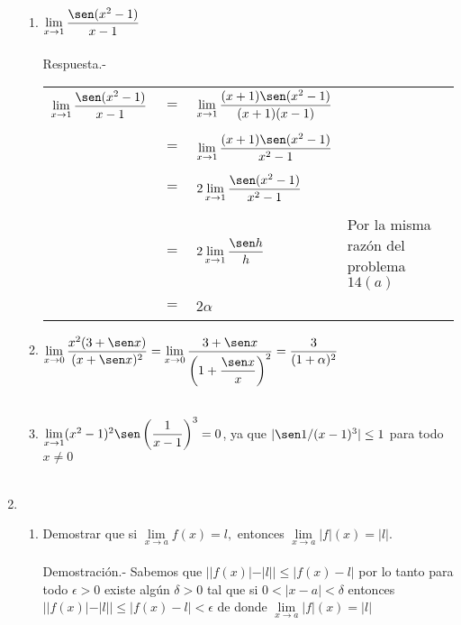 \begin{enumerate}
\begin{enumerate}[\bfseries (i)]
    \item $\lim\limits_{x\to 1}\dfrac{\sen(x^2-1)}{x-1}$\\\\
	Respuesta.-\; 
	\begin{center}
	    \begin{tabular}{rcll}
		$\lim\limits_{x\to 1} \dfrac{\sen (x^2 - 1)}{x-1}$ & $=$ & $\lim\limits_{x\to 1} \dfrac{(x+1)\sen(x^2 - 1)}{(x+1)(x-1)}$&\\\\
		 & $=$ & $\lim\limits_{x\to 1} \dfrac{(x+1)\sen (x^2 -1)}{x^2-1}$&\\\\
		 & $=$ & $2 \lim\limits_{x\to 1} \dfrac{\sen (x^2-1)}{x^2-1}$&\\\\
		 & $=$ & $2 \lim\limits_{x\to 1} \dfrac{\sen h}{h}$&Por la misma razón del problema $14(a)$\\\\
		 & $=$ & $2\alpha$&\\\\
	    \end{tabular}
	\end{center}

    \item $\lim\limits_{x\to 0} \dfrac{x^2(3+\sen x)}{(x+\sen x)^2} = \lim\limits_{x\to 0} \dfrac{3+\sen x}{\left(1 + \dfrac{\sen x}{x}\right)^2} = \dfrac{3}{(1+\alpha)^2}$\\\\

    \item $\lim\limits_{x\to 1} (x^2 - 1)^2 \sen \left(\dfrac{1}{x-1}\right)^3 = 0$, ya que $|\sen 1 / (x-1)^3 |\leq 1$ para todo $x\neq 0$\\\\

\end{enumerate}

\item 
\begin{enumerate}[\bfseries (a)]
    
    \item Demostrar que si $\lim\limits_{x\to a} f(x)=l,$ entonces $\lim\limits_{x\to a} |f|(x)=|l|$.\\\\
    Demostración.-\; Sabemos que $||f(x)|-|l|| \leq |f(x)-l|$ por lo tanto para todo $\epsilon>0$ existe algún $\delta>0$ tal que  si $0<|x-a|<\delta$ entonces $||f(x)|-|l||\leq |f(x)-l|<\epsilon$ de donde $\lim\limits_{x\to a} |f|(x)=|l|$\\\\


\end{enumerate}
\end{enumerate}

